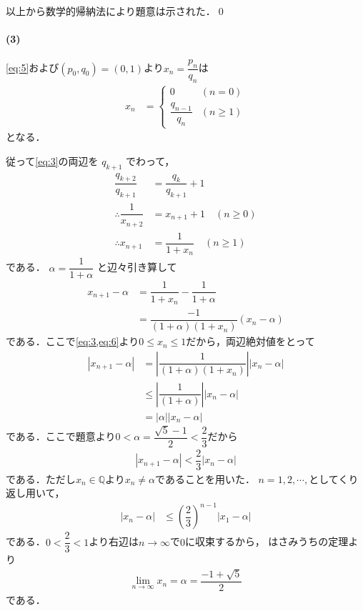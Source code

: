 \documentclass[../../main.tex]{subfiles}
\begin{document}
以上から数学的帰納法により題意は示された．\qed

\paragraph{(3)}

\cref{eq:5}および$(p_0,q_0)=(0,1)$より$x_n=\dfrac{p_n}{q_n}$は
\begin{align}
  x_n &=
  \begin{cases}
    0 & (n = 0) \\
    \dfrac{q_{n-1}}{q_n} & (n \ge 1)
  \end{cases} \label{eq:6}
\end{align}
となる．

従って\cref{eq:3}の両辺を $q_{k+1}$ でわって，
\begin{align}
  \dfrac{q_{k+2}}{q_{k+1}} &= \dfrac{q_k}{q_{k+1}}+1 \\
  \therefore
  \dfrac{1}{x_{n+2}} &= x_{n+1} + 1 \quad (n \ge 0) \\
  \therefore
  x_{n+1} &= \dfrac{1}{1 + x_n} \quad (n \ge 1)
\end{align}
である． $\alpha = \dfrac{1}{1 + \alpha}$ と辺々引き算して
\begin{align}
  x_{n+1} - \alpha &= \dfrac{1}{1 + x_n} - \dfrac{1}{1 + \alpha} \\
  &= \dfrac{-1}{(1 + \alpha)(1 + x_n)} (x_n - \alpha)
\end{align}
である．ここで\cref{eq:3,eq:6}より$0\le x_n \le 1$だから，両辺絶対値をとって
\begin{align}
  |x_{n+1} - \alpha|
  &= \left| \dfrac{1}{(1 + \alpha)(1 + x_n)} \right| |x_n - \alpha| \\
  &\le  \left| \dfrac{1}{(1 + \alpha)} \right| |x_n - \alpha| \\
  &=   \left| \alpha \right| |x_n - \alpha|
\end{align}
である．ここで題意より$0<\alpha=\dfrac{\sqrt{5}-1}{2}<\dfrac{2}{3}$だから
\begin{align}
  |x_{n+1} - \alpha| < \dfrac{2}{3}|x_n - \alpha|
\end{align}
である．ただし$x_n \in \mathbb{Q}$より$x_n \neq \alpha$であることを用いた．
$n=1, 2,\cdots,$としてくり返し用いて，
\begin{align}
  |x_n - \alpha| & \le \left(\dfrac{2}{3}\right)^{n-1} |x_1 - \alpha|
\end{align}
である．$0<\dfrac{2}{3}<1$より右辺は$n\to\infty$で$0$に収束するから，
はさみうちの定理より
\begin{align}
  \lim_{n\to\infty}x_n = \alpha = \dfrac{-1 + \sqrt{5}}{2}
\end{align}
である．

\newpage
\end{document}
